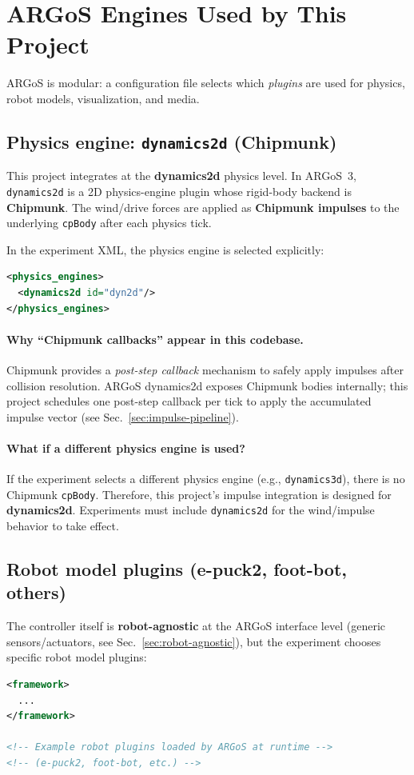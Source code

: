 \documentclass[11pt,a4paper]{article}
\begin{document}
\section{ARGoS Engines Used by This Project}
ARGoS is modular: a configuration file selects which \emph{plugins} are used for physics, robot models, visualization, and media.

\subsection{Physics engine: \texttt{dynamics2d} (Chipmunk)}
This project integrates at the \textbf{dynamics2d} physics level. In ARGoS~3, \texttt{dynamics2d} is a 2D physics-engine plugin
whose rigid-body backend is \textbf{Chipmunk}. The wind/drive forces are applied as \textbf{Chipmunk impulses} to the underlying
\texttt{cpBody} after each physics tick.

In the experiment XML, the physics engine is selected explicitly:
\begin{lstlisting}[language=XML]
<physics_engines>
  <dynamics2d id="dyn2d"/>
</physics_engines>
\end{lstlisting}

\paragraph{Why “Chipmunk callbacks” appear in this codebase.}
Chipmunk provides a \emph{post-step callback} mechanism to safely apply impulses after collision resolution. ARGoS dynamics2d exposes
Chipmunk bodies internally; this project schedules one post-step callback per tick to apply the accumulated impulse vector
(see Sec.~\ref{sec:impulse-pipeline}).

\paragraph{What if a different physics engine is used?}
If the experiment selects a different physics engine (e.g., \texttt{dynamics3d}), there is no Chipmunk \texttt{cpBody}.
Therefore, this project’s impulse integration is designed for \textbf{dynamics2d}. Experiments must include \texttt{dynamics2d}
for the wind/impulse behavior to take effect.

\subsection{Robot model plugins (e-puck2, foot-bot, others)}
The controller itself is \textbf{robot-agnostic} at the ARGoS interface level (generic sensors/actuators, see Sec.~\ref{sec:robot-agnostic}),
but the experiment chooses specific robot model plugins:
\begin{lstlisting}[language=XML]
<framework>
  ...
</framework>

<!-- Example robot plugins loaded by ARGoS at runtime -->
<!-- (e-puck2, foot-bot, etc.) -->
\end{lstlisting}
\end{document}
